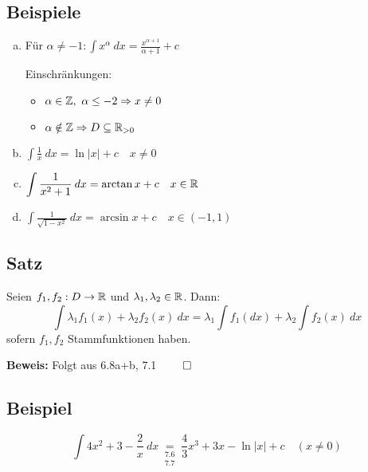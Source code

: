 \documentclass[10pt, a4paper, fleqn]{article}
\begin{document}
\subsection{Beispiele}
\begin{enumerate}[a)]
    \item Für $\displaystyle \alpha \neq -1: \int x^\alpha \:dx = \frac{x^{\alpha + 1}}{\alpha + 1} + c$
   
    Einschränkungen: \begin{itemize}
        \item $\alpha \in \mathbb{Z}, \ \alpha \leq -2 \Rightarrow x \neq 0$
        \item $\alpha \notin \mathbb{Z} \Rightarrow D \subseteq \mathbb{R}_{> 0}$
    \end{itemize}

    \item $\displaystyle \int \frac{1}{x} \:dx = \ln |x| + c \quad x \neq 0$
    \item $\displaystyle \int \frac{1}{x^2 + 1} \:dx = \arctan x + c \quad x \in \mathbb{R}$
    \item $\displaystyle \int \frac{1}{\sqrt{1 - x^2}} \:dx = \arcsin x + c \quad x \in (-1, 1)$
\end{enumerate}

\subsection{Satz}
Seien $f_1, f_2: D \to \mathbb{R}$ und $\lambda_1, \lambda_2 \in \mathbb{R}$.
Dann:
\[
    \int \lambda_1 f_1(x) + \lambda_2 f_2(x) \:dx = \lambda_1 \int f_1(dx) + \lambda_2 \int f_2(x) \:dx   
\]
sofern $f_1, f_2$ Stammfunktionen haben.

\textbf{Beweis: } Folgt aus 6.8a+b, 7.1 $\qed$

\subsection{Beispiel}
\[
    \int 4x^2 + 3 - \frac{2}{x} \:dx \underset{\substack{
        \text{7.6} \\ \text{7.7}}}{=}
    \frac{4}{3}x^3 + 3x - \ln |x| + c \quad (x \neq 0)  
\]
\ifdefined\MAINDOC\else
\end{document}
